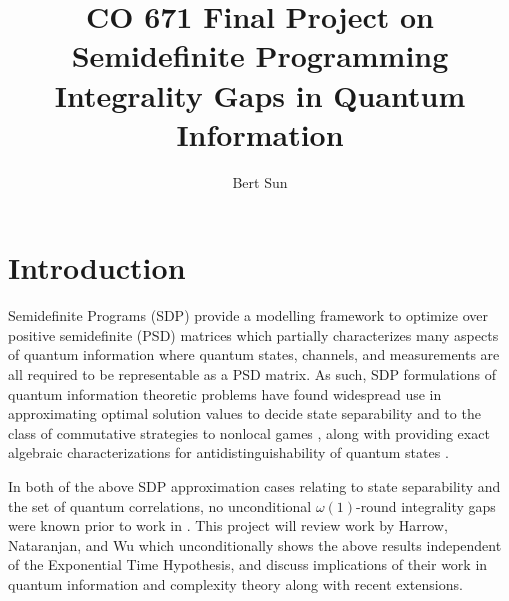 \documentclass[runningheads,a4paper,english]{llncs}[2022/01/12]
\begin{document}
\title{CO 671 Final Project on Semidefinite Programming Integrality Gaps in Quantum Information}
{}

\author{Bert Sun}



%
%

\maketitle




\section{Introduction}
\label{sec:introduction}
Semidefinite Programs (SDP) provide a modelling framework to optimize over positive semidefinite (PSD) matrices which partially characterizes many aspects of quantum information where quantum states, channels, and measurements are all required to be representable as a PSD matrix.
As such, SDP formulations of quantum information theoretic problems have found widespread use in approximating optimal solution values to decide state separability \cite{DPShierarchy} and to the class of commutative strategies to nonlocal games \cite{NPAhierarchy}, along with providing exact algebraic characterizations for antidistinguishability of quantum states \cite{Johnston2025tightbounds}.

In both of the above SDP approximation cases relating to state separability and the set of quantum correlations, no unconditional $\omega(1)$-round integrality gaps were known prior to work in \cite{Harrow_2019}.
This project will review work by Harrow, Nataranjan, and Wu which unconditionally shows the above results independent of the Exponential Time Hypothesis, and discuss implications of their work in quantum information and complexity theory along with recent extensions.
\end{document}
